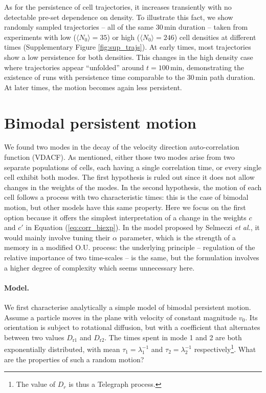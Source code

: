 \documentclass[11pt, twocolumn]{article}
\newcommand\rev[1]{{#1}}
\newcommand{\Dru}{{D_{\mathrm{r1}}}}
\newcommand{\Drd}{{D_{\mathrm{r2}}}}
\newcommand{\lamu}{\lambda_1}
\newcommand{\lamd}{\lambda_2}
\newcommand{\tauu}{\tau_1}
\newcommand{\taud}{\tau_2}
\begin{document}
As for the persistence of cell trajectories, it increases transiently
with no detectable pre-set dependence on density. To illustrate this
fact, we show randomly sampled trajectories -- all of the same
$30\,$min duration -- taken from experiments with low
($\langle N_0\rangle=35$) or high ($\langle N_0\rangle=246$) cell
densities at different times (Supplementary Figure
\ref{fig:sup_trajs}). At early times, most trajectories show a low
persistence for both densities. This changes in the high density case
where trajectories appear ``unfolded'' around $t=100\,$min,
demonstrating the existence of runs with persistence time comparable
to the $30\,$min path duration. At later times, the motion becomes
again less persistent.

\clearpage
\section{Bimodal persistent motion}

\rev{
We found two modes in the decay of the velocity direction auto-correlation
function (VDACF). As mentioned, either those two modes arise from two separate
populations of cells, each having a single correlation time, or every
single cell exhibit both modes. The first hypothesis is ruled out since
it does not allow changes in the weights of the modes. In the second
hypothesis, the motion of each cell follows a process with two characteristic
times: this is the case of bimodal motion\cite{Potdar2010,Maiuri2015,Metzner2015},
but other models have this same property\cite{Selmeczi2005}. Here we focus on
the first option because it offers the simplest interpretation of a change
in the weights $c$ and $c'$ in Equation (\ref{eq:corr_biexp}). In the model
proposed by Selmeczi \textit{et al.}\cite{Selmeczi2005}, it would mainly
involve tuning their $\alpha$ parameter, which is the strength of a memory in
a modified O.U. process: the underlying principle -- regulation of the relative
importance of two time-scales -- is the same, but the formulation involves
a higher degree of complexity which seems unnecessary here.}

\paragraph{Model.}
%
We first characterise analytically a simple model of bimodal
persistent motion.  Assume a particle moves in the plane with velocity
of constant magnitude $v_0$.  Its orientation is subject to rotational
diffusion, but with a coefficient that alternates between two values
$\Dru$ and $\Drd$.  The times spent in mode 1 and 2 are both
exponentially distributed, with mean $\tauu=\lamu^{-1}$ and
$\taud=\lamd^{-1}$ respectively\footnote{The value of $D_r$ is thus a
  Telegraph process.}.  What are the properties of such a random
motion?
\end{document}
